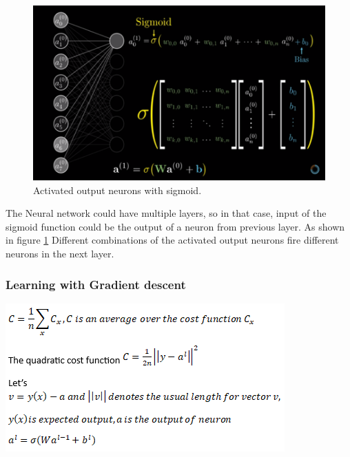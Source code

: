 \documentclass{article}
\begin{document}
\begin{figure}[H]
\centering
\includegraphics[scale=0.75]{img/sig_eqn.png}
\caption{Activated output neurons with sigmoid.\protect\cite{DL}}
\label{sig}
\end{figure}

The Neural network could have multiple layers, so in that case, input of the sigmoid function could be the output of a neuron from previous layer. As shown in figure \ref{sig} Different combinations of the activated output neurons fire different neurons in the next layer.

\subsubsection{Learning with Gradient descent}

\includegraphics[scale=0.8]{img/gradient.png}
\end{document}
